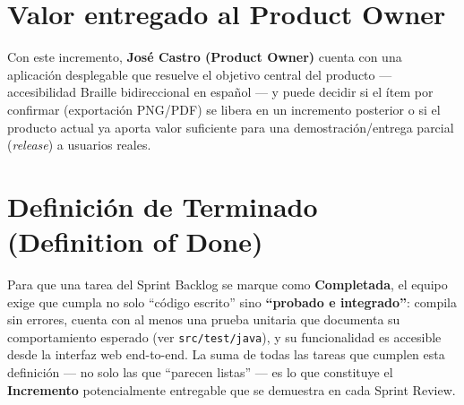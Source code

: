 \documentclass[11pt]{article}
\begin{document}
\section{Valor entregado al Product Owner}
Con este incremento, \textbf{José Castro (Product Owner)} cuenta con una aplicación desplegable que
resuelve el objetivo central del producto --- accesibilidad Braille bidireccional en español --- y puede
decidir si el ítem por confirmar (exportación PNG/PDF) se libera en un incremento posterior o si el
producto actual ya aporta valor suficiente para una demostración/entrega parcial (\textit{release}) a
usuarios reales.

\section{Definición de Terminado (Definition of Done)}
Para que una tarea del Sprint Backlog se marque como \textbf{Completada}, el equipo exige que cumpla no
solo ``código escrito'' sino \textbf{``probado e integrado''}: compila sin errores, cuenta con al menos
una prueba unitaria que documenta su comportamiento esperado (ver \texttt{src/test/java}), y su
funcionalidad es accesible desde la interfaz web end-to-end. La suma de todas las tareas que cumplen esta
definición --- no solo las que ``parecen listas'' --- es lo que constituye el \textbf{Incremento}
potencialmente entregable que se demuestra en cada Sprint Review.
\end{document}
